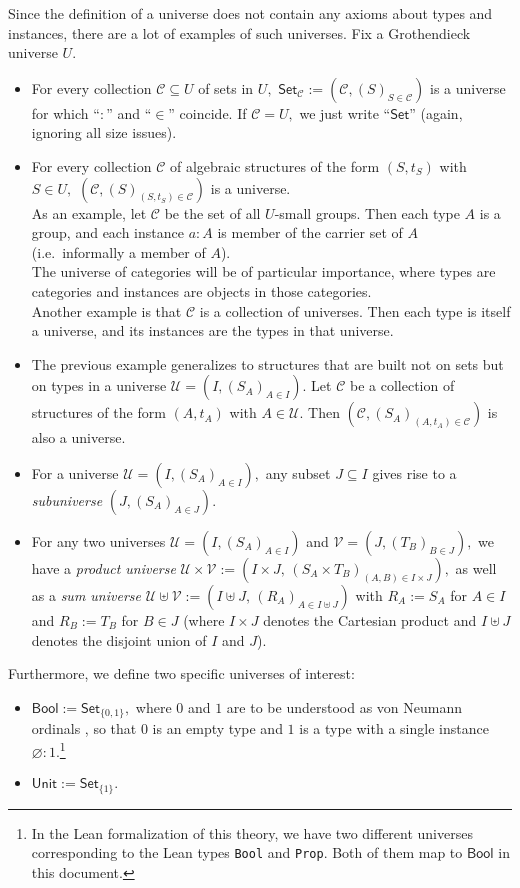 \documentclass[a4paper]{article}
\theoremstyle{definition}
\theoremstyle{remark}
\newcommand{\defn}{\emph}
\renewcommand{\emptyset}{\varnothing}
\newcommand{\C}{\mathcal{C}}
\newcommand{\U}{\mathcal{U}}
\newcommand{\V}{\mathcal{V}}
\newcommand{\nm}{\mathsf}
\newcommand{\universe}{\nm}
\newcommand{\Unit}{\universe{Unit}}
\newcommand{\Bool}{\universe{Bool}}
\newcommand{\Set}{\universe{Set}}
\newcommand{\Lean}{\texttt}
\begin{document}
Since the definition of a universe does not contain any axioms about types and instances, there
are a lot of examples of such universes. Fix a Grothendieck universe $U.$

\begin{itemize}
  \item For every collection $\C \subseteq U$ of sets in $U,$ $\Set_\C := (\C, (S)_{S \in \C})$ is a
  universe for which ``$:$'' and ``$\in$'' coincide.
  If $\C = U,$ we just write ``$\Set$'' (again, ignoring all size issues).
  \item For every collection $\C$ of algebraic structures of the form $(S, t_S)$ with $S \in U,$
  $(\C, (S)_{(S, t_S) \in \C})$ is a universe.\\
  As an example, let $\C$ be the set of all $U$-small groups. Then each type $A$ is a group, and
  each instance $a : A$ is member of the carrier set of $A$ (i.e.\ informally a member of $A$).\\
  The universe of categories will be of particular importance, where types are categories and instances
  are objects in those categories.\\
  Another example is that $\C$ is a collection of universes. Then each type is itself a universe, and
  its instances are the types in that universe.
  \item The previous example generalizes to structures that are built not on sets but on types in a
  universe $\U = (I, (S_A)_{A \in I}).$ Let $\C$ be a collection of structures of the form $(A,t_A)$ with
  $A \in \U$. Then $(\C, (S_A)_{(A, t_A) \in \C})$ is also a universe.
  \item For a universe $\U = (I, (S_A)_{A \in I}),$ any subset $J \subseteq I$ gives rise to a
  \defn{subuniverse} $(J, (S_A)_{A \in J}).$
  \item For any two universes $\U = (I, (S_A)_{A \in I})$ and $\V = (J, (T_B)_{B \in J}),$ we have a
  \defn{product universe} $\U \times \V := (I{\times}J,\,(S_A{\times}T_B)_{(A,B) \in I{\times}J}),$ as
  well as a \defn{sum universe} $\U \uplus \V := (I \uplus J,\,(R_A)_{A \in I \uplus J})$ with
  $R_A := S_A$ for $A \in I$ and $R_B := T_B$ for $B \in J$ (where $I \times J$ denotes the Cartesian
  product and $I \uplus J$ denotes the disjoint union of $I$ and $J$).
\end{itemize}

Furthermore, we define two specific universes of interest:
\begin{itemize}
  \item $\Bool := \Set_{\{0, 1\}},$ where $0$ and $1$ are to be understood as von Neumann ordinals
  \cite{von-neumann-ordinals}, so that $0$ is an empty type and $1$ is a type with a single
  instance $\emptyset : 1.$\footnote{In the Lean formalization of this theory, we have two different universes
  corresponding to the Lean types \Lean{Bool} and \Lean{Prop}. Both of them map to $\Bool$ in this document.}
  \item $\Unit := \Set_{\{1\}}.$
\end{itemize}
\end{document}
